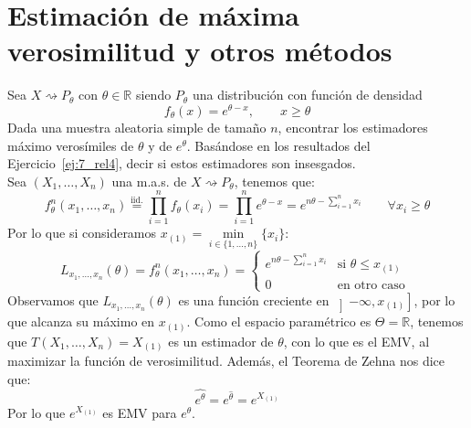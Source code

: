\newpage
\section{Estimación de máxima verosimilitud y otros métodos}
\begin{ejercicio}
    Sea $X\rightsquigarrow P_\theta$ con $\theta\in \mathbb{R}$ siendo $P_\theta$ una distribución con función de densidad
    \begin{equation*}
        f_\theta(x) = e^{\theta-x}, \qquad x\geq \theta
    \end{equation*}
    Dada una muestra aleatoria simple de tamaño $n$, encontrar los estimadores máximo verosímiles de $\theta$ y de $e^\theta$. Basándose en los resultados del Ejercicio~\ref{ej:7_rel4}, decir si estos estimadores son insesgados.\\

    \noindent
    Sea $(X_1, \ldots, X_n)$ una m.a.s. de $X\rightsquigarrow  P_\theta$, tenemos que:
    \begin{equation*}
        f^n_\theta(x_1, \ldots, x_n) \stackrel{\text{iid.}}{=} \prod_{i=1}^{n}f_\theta(x_i) = \prod_{i=1}^{n} e^{\theta-x} = e^{n\theta - \sum\limits_{i=1}^n x_i} \qquad \forall x_i \geq \theta
    \end{equation*}
    Por lo que si consideramos $x_{(1)} = \min\limits_{i \in \{1,\ldots,n\}}\{x_i\}$:
    \begin{equation*}
        L_{x_1,\ldots, x_n}(\theta) = f^n_\theta(x_1,\ldots,x_n) = \left\{\begin{array}{ll}
                e^{n\theta - \sum\limits_{i=1}^n x_i}  & \text{si\ } \theta \leq x_{(1)}  \\
             0 & \text{en otro caso\ } 
        \end{array}\right. 
    \end{equation*}
    Observamos que $L_{x_1,\ldots,x_n}(\theta)$ es una función creciente en $\left]-\infty,x_{(1)}\right]$, por lo que alcanza su máximo en $x_{(1)}$. Como el espacio paramétrico es $\Theta = \mathbb{R}$, tenemos que $T(X_1, \ldots, X_n) = X_{(1)}$ es un estimador de $\theta$, con lo que es el EMV, al maximizar la función de verosimilitud. Además, el Teorema de Zehna nos dice que:
    \begin{equation*}
        \widehat{e^\theta} = e^{\hat{\theta}} = e^{X_{(1)}}
    \end{equation*}
    Por lo que $e^{X_{(1)}}$ es EMV para $e^{\theta}$. %
\end{ejercicio}


